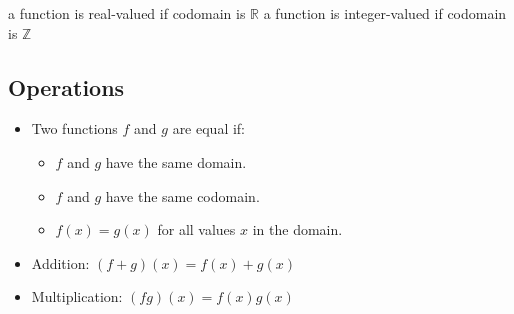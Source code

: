 \documentclass{article}
\theoremstyle{mytheoremstyle}
\theoremstyle{mytheoremstyle}
\theoremstyle{myproblemstyle}
\begin{document}
    a function is real-valued if codomain is $\mathbb{R}$
    a function is integer-valued if codomain is $\mathbb{Z}$

    \subsection*{Operations}
    \begin{itemize}
        \item Two functions $f$ and $g$ are equal if:
            \begin{itemize}
                \item $f$ and $g$ have the same domain.
                \item $f$ and $g$ have the same codomain.
                \item $f(x) = g(x)$ for all values $x$ in the domain.
            \end{itemize}
        \item Addition: $(f+g)(x) = f(x) + g(x)$
        \item Multiplication: $(fg)(x) = f(x)g(x)$
    \end{itemize}
\end{document}
